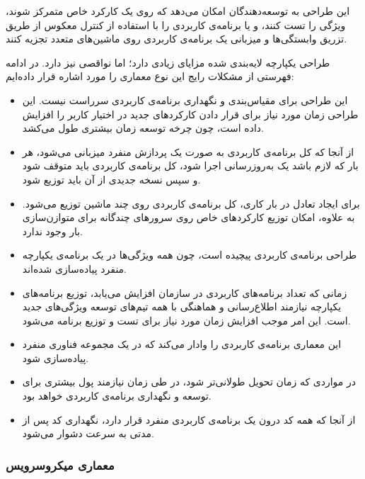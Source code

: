 \hfill

این طراحی به توسعه‌دهندگان امکان می‌دهد که روی یک کارکرد خاص متمرکز شوند، ویژگی را تست کنند، و یا برنامه‌ی کاربردی را با استفاده از کنترل معکوس از طریق تزریق وابستگی‌ها و میزبانی یک برنامه‌ی کاربردی روی ماشین‌های متعدد تجزیه کنند.

طراحی یکپارچه لایه‌بندی شده مزایای زیادی دارد؛ اما نواقصی نیز دارد. در ادامه فهرستی از مشکلات رایج این نوع معماری را مورد اشاره قرار داده‌ایم:

\begin{itemize}
	
	\item این طراحی برای مقیاس‌بندی و نگهداری برنامه‌ی کاربردی سرراست نیست. این طراحی زمان مورد نیاز برای قرار دادن کارکردهای جدید در اختیار کاربر را افزایش داده است، چون چرخه توسعه زمان بیشتری طول می‌کشد.
	
	\item از آنجا که کل برنامه‌ی کاربردی به صورت یک پردازش منفرد میزبانی می‌شود، هر بار که لازم باشد یک به‌روزرسانی اجرا شود، کل برنامه‌ی کاربردی باید متوقف شود و سپس نسخه جدیدی از آن باید توزیع شود.
	
	\item برای ایجاد تعادل در بار کاری، کل برنامه‌ی کاربردی روی چند ماشین توزیع می‌شود. به علاوه، امکان توزیع کارکردهای خاص روی سرورهای چندگانه برای متوازن‌سازی بار وجود ندارد.
	
	\item طراحی برنامه‌ی کاربردی پیچیده است، چون همه ویژگی‌ها در یک برنامه‌ی یکپارچه منفرد پیاده‌سازی شده‌اند.
	
	\item زمانی که تعداد برنامه‌های کاربردی‌ در سازمان افزایش می‌یابد، توزیع برنامه‌های یکپارچه نیازمند اطلاع‌رسانی و هماهنگی با همه تیم‌های توسعه ویژگی‌های جدید است. این امر موجب افزایش زمان مورد نیاز برای تست و توزیع برنامه می‌شود.
	
	\item این معماری برنامه‌ی کاربردی را وادار می‌کند که در یک مجموعه فناوری منفرد پیاده‌سازی شود.
	
	\item در مواردی که زمان تحویل طولانی‌تر شود، در طی زمان نیازمند پول بیشتری برای توسعه و نگهداری برنامه‌ی کاربردی خواهد بود.
	
	\item از آنجا که همه کد درون یک برنامه‌ی کاربردی منفرد قرار دارد، نگهداری کد پس از مدتی به سرعت دشوار می‌شود.
	
\end{itemize}

\subsubsection{معماری میکروسرویس}

